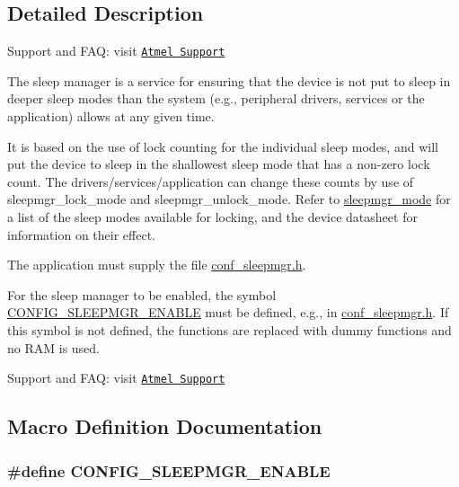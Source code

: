 \subsection{Detailed Description}
Support and F\-A\-Q\-: visit \href{http://www.atmel.com/design-support/}{\tt Atmel Support}

The sleep manager is a service for ensuring that the device is not put to sleep in deeper sleep modes than the system (e.\-g., peripheral drivers, services or the application) allows at any given time.

It is based on the use of lock counting for the individual sleep modes, and will put the device to sleep in the shallowest sleep mode that has a non-\/zero lock count. The drivers/services/application can change these counts by use of sleepmgr\-\_\-lock\-\_\-mode and sleepmgr\-\_\-unlock\-\_\-mode. Refer to \hyperlink{group__sleepmgr__group_gaa990bc3ea16fcad09009cdc70dbc38c6}{sleepmgr\-\_\-mode} for a list of the sleep modes available for locking, and the device datasheet for information on their effect.

The application must supply the file \hyperlink{conf__sleepmgr_8h}{conf\-\_\-sleepmgr.\-h}.

For the sleep manager to be enabled, the symbol \hyperlink{group__sleepmgr__group_gad8e649a9d53092c580960f2f9886ee98}{C\-O\-N\-F\-I\-G\-\_\-\-S\-L\-E\-E\-P\-M\-G\-R\-\_\-\-E\-N\-A\-B\-L\-E} must be defined, e.\-g., in \hyperlink{conf__sleepmgr_8h}{conf\-\_\-sleepmgr.\-h}. If this symbol is not defined, the functions are replaced with dummy functions and no R\-A\-M is used.

Support and F\-A\-Q\-: visit \href{http://www.atmel.com/design-support/}{\tt Atmel Support} 

\subsection{Macro Definition Documentation}
\hypertarget{group__sleepmgr__group_gad8e649a9d53092c580960f2f9886ee98}{
\subsubsection[{C\-O\-N\-F\-I\-G\-\_\-\-S\-L\-E\-E\-P\-M\-G\-R\-\_\-\-E\-N\-A\-B\-L\-E}]{\setlength{\rightskip}{0pt plus 5cm}\#define C\-O\-N\-F\-I\-G\-\_\-\-S\-L\-E\-E\-P\-M\-G\-R\-\_\-\-E\-N\-A\-B\-L\-E}}\label{group__sleepmgr__group_gad8e649a9d53092c580960f2f9886ee98}


